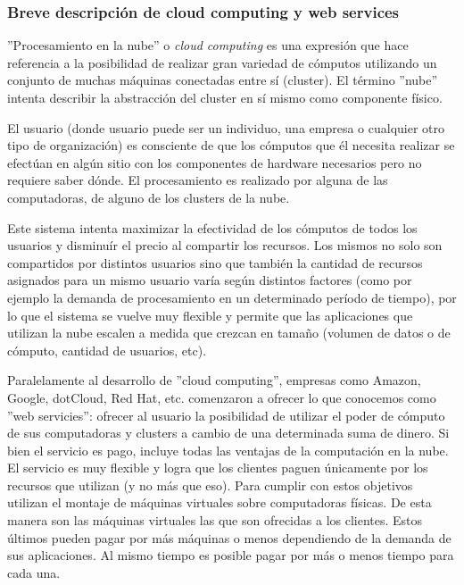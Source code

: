 \subsubsection{Breve descripción de cloud computing y web services}

''Procesamiento en la nube'' o \emph{cloud computing} es una expresión que hace referencia a la posibilidad de 
realizar gran variedad de cómputos utilizando un conjunto de muchas máquinas conectadas entre sí 
(cluster). El término ''nube'' intenta describir la abstracción del cluster en sí mismo como componente físico.

El usuario (donde usuario puede ser un individuo, una empresa o cualquier otro tipo de
organización) 
es consciente de que los cómputos que él necesita realizar se efectúan en algún sitio con los componentes
de hardware necesarios pero no requiere saber dónde. El procesamiento es realizado por alguna de las computadoras,
de alguno de los clusters de la nube.

Este sistema intenta maximizar la efectividad de los cómputos de todos los usuarios 
y disminuír el precio al compartir los recursos.
Los mismos no solo son compartidos por distintos usuarios sino que también la cantidad de recursos asignados
para un mismo usuario varía según distintos factores (como por ejemplo la demanda de procesamiento en un
determinado período de tiempo), por lo que el sistema se vuelve muy flexible y permite que las aplicaciones
que utilizan la nube escalen a medida que crezcan en tama\~no (volumen de datos
o de cómputo, cantidad de usuarios, etc).

Paralelamente al desarrollo de ''cloud computing'', empresas como Amazon, Google, dotCloud, Red Hat, etc. comenzaron
a ofrecer lo que conocemos como ''web servicies'': ofrecer al usuario la posibilidad de utilizar el poder de cómputo
de sus computadoras y clusters a cambio de una determinada suma de dinero. Si bien el servicio es pago, incluye
todas las ventajas de la computación en la nube. El servicio es muy flexible y logra que los clientes paguen
únicamente por los recursos que utilizan (y no más que eso). Para cumplir con estos objetivos utilizan el montaje de
máquinas virtuales sobre computadoras físicas. De esta manera son las máquinas virtuales las que son ofrecidas
a los clientes. Estos últimos pueden pagar por más máquinas o menos dependiendo de la demanda de sus aplicaciones.
Al mismo tiempo es posible pagar por más o menos tiempo para cada una.

~

